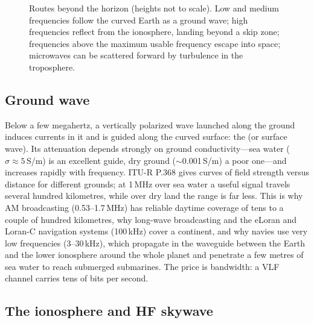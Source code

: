 \begin{figure}[H]
\caption{Routes beyond the horizon (heights not to scale). Low and medium frequencies follow the
curved Earth as a ground wave; high frequencies reflect from the ionosphere, landing beyond a skip
zone; frequencies above the maximum usable frequency escape into space; microwaves can be
scattered forward by turbulence in the troposphere.}
\label{fig:ch11_modes}
\end{figure}

\subsection{Ground wave}

Below a few megahertz, a vertically polarized wave launched along the ground induces currents
in it and is guided along the curved surface: the  (or surface wave). Its
attenuation depends strongly on ground conductivity---sea water ($\sigma\approx5$\,S/m) is an
excellent guide, dry ground ($\sim$0.001\,S/m) a poor one---and increases rapidly with frequency.
ITU-R P.368 gives curves of field strength versus distance for different grounds; at 1\,MHz
over sea water a useful signal travels several hundred kilometres, while over dry land the range
is far less. This is why AM broadcasting (0.53--1.7\,MHz) has reliable daytime coverage of
tens to a couple of hundred kilometres, why long-wave broadcasting and the eLoran and Loran-C
navigation systems (100\,kHz) cover a continent, and why navies use very low frequencies
(3--30\,kHz), which propagate in the waveguide between the Earth and the lower ionosphere
around the whole planet and penetrate a few metres of sea water to reach submerged submarines.
The price is bandwidth: a VLF channel carries tens of bits per second.

\subsection{The ionosphere and HF skywave}

